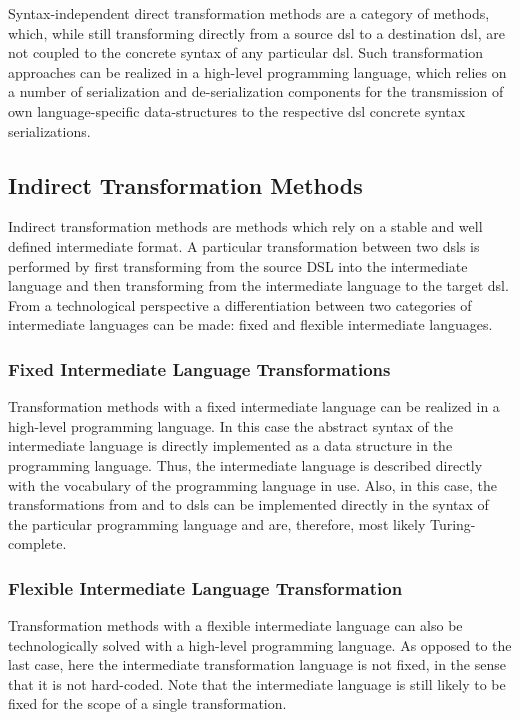 Syntax-independent direct transformation methods are a category of methods, which, while still transforming directly from a source \gls{dsl} to a destination \gls{dsl}, are not coupled to the concrete syntax of any particular \gls{dsl}. Such transformation approaches can be realized in a high-level programming language, which relies on a number of serialization and de-serialization components for the transmission of own language-specific data-structures to the respective \gls{dsl} concrete syntax serializations.

\subsection{Indirect Transformation Methods}

Indirect transformation methods are methods which rely on a stable and well defined intermediate format. A particular transformation between two \glspl{dsl} is performed by first transforming from the source DSL into the intermediate language and then transforming from the intermediate language to the target \gls{dsl}. From a technological perspective a differentiation between two categories of intermediate languages can be made: fixed and flexible intermediate languages.

\subsubsection{Fixed Intermediate Language Transformations}

Transformation methods with a fixed intermediate language can be realized in a high-level programming language. In this case the abstract syntax of the intermediate language is directly implemented as a data structure in the programming language. Thus, the intermediate language is described directly with the vocabulary of the programming language in use. Also, in this case, the transformations from and to \glspl{dsl} can be implemented directly in the syntax of the particular programming language and are, therefore, most likely Turing-complete.

\subsubsection{Flexible Intermediate Language Transformation}

Transformation methods with a flexible intermediate language can also be technologically solved with a high-level programming language. As opposed to the last case, here the intermediate transformation language is not fixed, in the sense that it is not hard-coded. Note that the intermediate language is still likely to be fixed for the scope of a single transformation.

